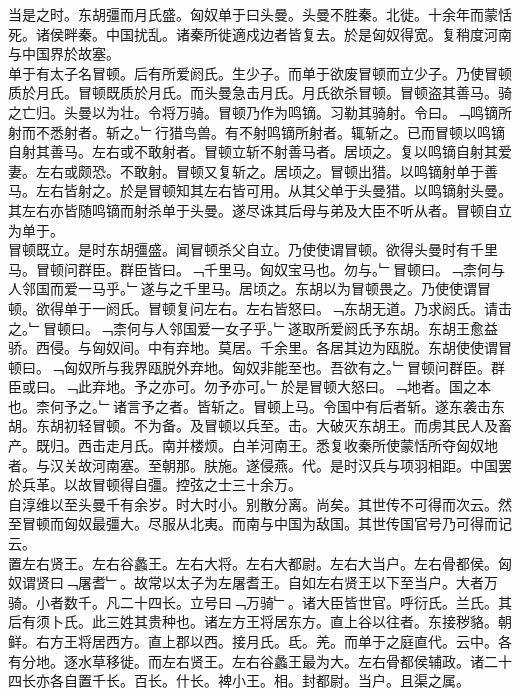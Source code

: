 \documentclass{zhvt-classic}
\begin{document}
\hspace*{2em}当是之时。东胡彊而月氏盛。匈奴单于曰头曼。头曼不胜秦。北徙。十余年而蒙恬死。诸侯畔秦。中国扰乱。诸秦所徙適戍边者皆复去。於是匈奴得宽。复稍度河南与中国界於故塞。\\
\hspace*{2em}单于有太子名冒顿。后有所爱阏氏。生少子。而单于欲废冒顿而立少子。乃使冒顿质於月氏。冒顿既质於月氏。而头曼急击月氏。月氏欲杀冒顿。冒顿盗其善马。骑之亡归。头曼以为壮。令将万骑。冒顿乃作为鸣镝。习勒其骑射。令曰。﹁鸣镝所射而不悉射者。斩之。﹂行猎鸟兽。有不射鸣镝所射者。辄斩之。已而冒顿以鸣镝自射其善马。左右或不敢射者。冒顿立斩不射善马者。居顷之。复以鸣镝自射其爱妻。左右或颇恐。不敢射。冒顿又复斩之。居顷之。冒顿出猎。以鸣镝射单于善马。左右皆射之。於是冒顿知其左右皆可用。从其父单于头曼猎。以鸣镝射头曼。其左右亦皆随鸣镝而射杀单于头曼。遂尽诛其后母与弟及大臣不听从者。冒顿自立为单于。\\
\hspace*{2em}冒顿既立。是时东胡彊盛。闻冒顿杀父自立。乃使使谓冒顿。欲得头曼时有千里马。冒顿问群臣。群臣皆曰。﹁千里马。匈奴宝马也。勿与。﹂冒顿曰。﹁柰何与人邻国而爱一马乎。﹂遂与之千里马。居顷之。东胡以为冒顿畏之。乃使使谓冒顿。欲得单于一阏氏。冒顿复问左右。左右皆怒曰。﹁东胡无道。乃求阏氏。请击之。﹂冒顿曰。﹁柰何与人邻国爱一女子乎。﹂遂取所爱阏氏予东胡。东胡王愈益骄。西侵。与匈奴间。中有弃地。莫居。千余里。各居其边为瓯脱。东胡使使谓冒顿曰。﹁匈奴所与我界瓯脱外弃地。匈奴非能至也。吾欲有之。﹂冒顿问群臣。群臣或曰。﹁此弃地。予之亦可。勿予亦可。﹂於是冒顿大怒曰。﹁地者。国之本也。柰何予之。﹂诸言予之者。皆斩之。冒顿上马。令国中有后者斩。遂东袭击东胡。东胡初轻冒顿。不为备。及冒顿以兵至。击。大破灭东胡王。而虏其民人及畜产。既归。西击走月氏。南并楼烦。白羊河南王。悉复收秦所使蒙恬所夺匈奴地者。与汉关故河南塞。至朝那。肤施。遂侵燕。代。是时汉兵与项羽相距。中国罢於兵革。以故冒顿得自彊。控弦之士三十余万。\\
\hspace*{2em}自淳维以至头曼千有余岁。时大时小。别散分离。尚矣。其世传不可得而次云。然至冒顿而匈奴最彊大。尽服从北夷。而南与中国为敌国。其世传国官号乃可得而记云。\\
\hspace*{2em}置左右贤王。左右谷蠡王。左右大将。左右大都尉。左右大当户。左右骨都侯。匈奴谓贤曰﹁屠耆﹂。故常以太子为左屠耆王。自如左右贤王以下至当户。大者万骑。小者数千。凡二十四长。立号曰﹁万骑﹂。诸大臣皆世官。呼衍氏。兰氏。其后有须卜氏。此三姓其贵种也。诸左方王将居东方。直上谷以往者。东接秽貉。朝鲜。右方王将居西方。直上郡以西。接月氏。氐。羌。而单于之庭直代。云中。各有分地。逐水草移徙。而左右贤王。左右谷蠡王最为大。左右骨都侯辅政。诸二十四长亦各自置千长。百长。什长。裨小王。相。封都尉。当户。且渠之属。\\
\end{document}
